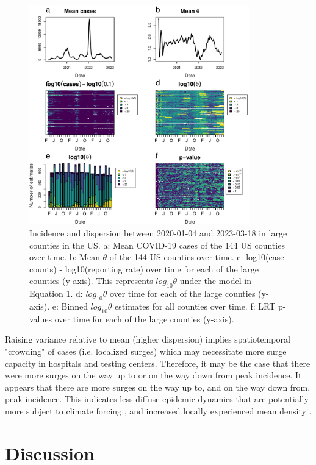 \documentclass[10pt,letterpaper]{article}
\begin{document}
\begin{figure}[!h]
\centering
\includegraphics[width=0.85\textwidth]{fig3.pdf}
\caption{
Incidence and dispersion between 2020-01-04 and 2023-03-18 in large counties in the US. a: Mean COVID-19 cases of the 144 US counties over time. b: Mean $\theta$ of the 144 US counties over time. c: log10(case counts) - log10(reporting rate) over time for each of the large counties (y-axis). This represents $log_{10}\theta$ under the model in Equation 1. d: $log_{10}\theta$ over time for each of the large counties (y-axis). e: Binned $log_{10}\theta$ estimates for all counties over time. f: LRT p-values over time for each of the large counties (y-axis).
}
\label{fig3}
\end{figure}

Raising variance relative to mean (higher dispersion) implies spatiotemporal "crowding" of cases (i.e. localized surges) which may necessitate more surge capacity in hospitals and testing centers. Therefore, it may be the case that there were more surges on the way up to or on the way down from peak incidence. It appears that there are more surges on the way up to, and on the way down from, peak incidence. 
This indicates less diffuse epidemic dynamics that are potentially more subject to climate forcing \cite{dalziel_urbanization_2018}, and increased locally experienced mean density \cite{lloyd_mean_1967}. 

\section*{Discussion}
\end{document}
